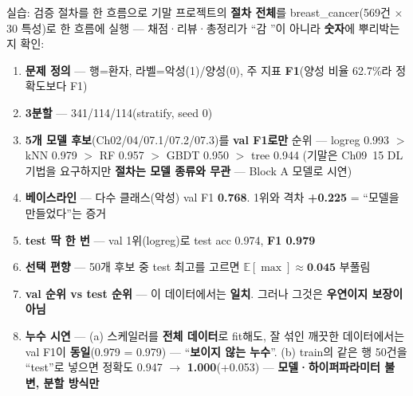 \documentclass[aspectratio=169,11pt]{beamer}
\begin{document}

\begin{frame}{실습: 검증 절차를 한 흐름으로}
  기말 프로젝트의 \textbf{절차 전체}를 breast\_cancer(569건
  $\times$ 30 특성)로 한 흐름에 실행 — 채점·리뷰·총정리가 ``감
  ''이 아니라 \textbf{숫자}에 뿌리박는지 확인:
  \small
  \begin{enumerate}
    \item \textbf{문제 정의} — 행=환자, 라벨=악성(1)/양성(0),
      주 지표 \textbf{F1}(양성 비율 62.7\%라 정확도보다 F1)
    \item \textbf{3분할} — 341/114/114(stratify, seed 0)
    \item \textbf{5개 모델 후보}(Ch02/04/07.1/07.2/07.3)를
      \textbf{val F1로만} 순위 — logreg 0.993 $>$ kNN 0.979 $>$
      RF 0.957 $>$ GBDT 0.950 $>$ tree 0.944 (기말은 Ch09~15
      DL 기법을 요구하지만 \textbf{절차는 모델 종류와 무관} —
      Block A 모델로 시연)
    \item \textbf{베이스라인} — 다수 클래스(악성) val F1
      \textbf{0.768}. 1위와 격차 \textbf{+0.225} = ``모델을
      만들었다''는 증거
    \item \textbf{test 딱 한 번} — val 1위(logreg)로 test
      acc 0.974, \textbf{F1 0.979}
    \item \textbf{선택 편향} — 50개 후보 중 test 최고를 고르면
      $\mathbb{E}[\max]\approx\textbf{0.045}$ 부풀림
    \item \textbf{val 순위 vs test 순위} — 이 데이터에서는
      \textbf{일치}. 그러나 그것은 \textbf{우연이지 보장이
      아님}
    \item \textbf{누수 시연} — (a) 스케일러를 \textbf{전체
      데이터}로 fit해도, 잘 섞인 깨끗한 데이터에서는 val F1이
      \textbf{동일}(0.979 = 0.979) — ``\textbf{보이지 않는
      누수}''. (b) train의 같은 행 50건을 ``test''로 넣으면
      정확도 0.947 $\to$ \textbf{1.000}(+0.053) —
      \textbf{모델·하이퍼파라미터 불변, 분할 방식만}
  \end{enumerate}
\end{frame}
\end{document}
